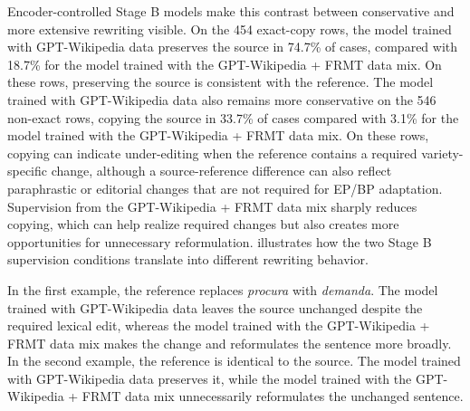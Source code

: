 \documentclass[acmtog,nonacm]{acmart}
\begin{document}
Encoder-controlled Stage B models make this contrast between conservative and
more extensive rewriting visible. On the 454 exact-copy rows, the model trained with
GPT-Wikipedia data preserves the source in 74.7\% of cases, compared with
18.7\% for the model trained with the GPT-Wikipedia + FRMT data mix. On these
rows, preserving the source is consistent with the reference. The model trained with GPT-Wikipedia data also remains more conservative on
the 546 non-exact rows, copying the source in 33.7\% of cases compared with
3.1\% for the model trained with the GPT-Wikipedia + FRMT data mix. On these
rows, copying can indicate under-editing when the reference contains a required
variety-specific change, although a source-reference difference can also
reflect paraphrastic or editorial changes that are not required for EP/BP
adaptation. Supervision from the GPT-Wikipedia + FRMT data mix sharply reduces
copying, which can help realize required changes but also creates more
opportunities for unnecessary reformulation.
 illustrates how the two Stage B supervision conditions translate into different rewriting behavior.

In the first example, the reference replaces \textit{procura} with
\textit{demanda}. The
model trained with GPT-Wikipedia data leaves the source unchanged despite the required lexical
edit, whereas the model trained with the GPT-Wikipedia + FRMT data mix makes the change and reformulates the
sentence more broadly. In the second example, the reference is identical to the source.
The model trained with GPT-Wikipedia data preserves it, while the model trained
with the GPT-Wikipedia + FRMT data mix unnecessarily reformulates the unchanged
sentence.
\end{document}
